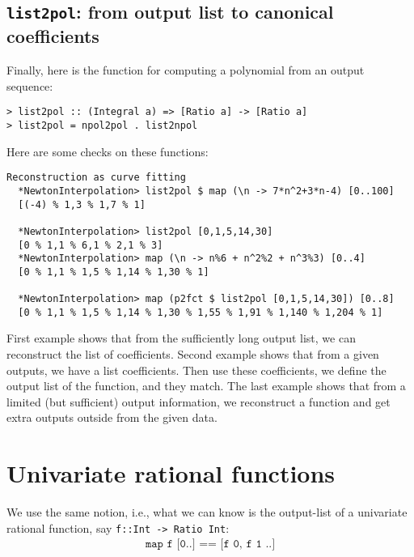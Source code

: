 \documentclass[11pt]{book}
\begin{document}
\subsection{\texttt{list2pol}: from output list to canonical coefficients}
Finally, here is the function for computing a polynomial from an output sequence:
\begin{verbatim}
> list2pol :: (Integral a) => [Ratio a] -> [Ratio a]
> list2pol = npol2pol . list2npol
\end{verbatim}
Here are some checks on these functions:
\begin{verbatim}
Reconstruction as curve fitting
  *NewtonInterpolation> list2pol $ map (\n -> 7*n^2+3*n-4) [0..100]
  [(-4) % 1,3 % 1,7 % 1]

  *NewtonInterpolation> list2pol [0,1,5,14,30]
  [0 % 1,1 % 6,1 % 2,1 % 3]
  *NewtonInterpolation> map (\n -> n%6 + n^2%2 + n^3%3) [0..4]
  [0 % 1,1 % 1,5 % 1,14 % 1,30 % 1]

  *NewtonInterpolation> map (p2fct $ list2pol [0,1,5,14,30]) [0..8]
  [0 % 1,1 % 1,5 % 1,14 % 1,30 % 1,55 % 1,91 % 1,140 % 1,204 % 1]

\end{verbatim}
First example shows that from the sufficiently long output list, we can reconstruct the list of coefficients.
Second example shows that from a given outputs, we have a list coefficients.
Then use these coefficients, we define the output list of the function, and they match.
The last example shows that from a limited (but sufficient) output information, we reconstruct a function and get extra outputs outside from the given data.

\section{Univariate rational functions}
We use the same notion, i.e., what we can know is the output-list of a univariate rational function, say \texttt{f::Int -> Ratio Int}:
\begin{eqnarray}
\texttt{map f [0..] == [f 0, f 1 ..]}
\end{eqnarray}
\end{document}
